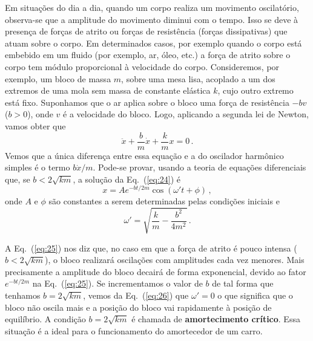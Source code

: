 \documentclass[12pt,a4paper]{article}
\theoremstyle{definition}
\begin{document}
Em situações do dia a dia, quando um corpo realiza um movimento
oscilatório, observa-se que a amplitude do movimento diminui com o
tempo. Isso se deve à presença de forças de atrito ou forças de
resistência (forças dissipativas) que atuam sobre o corpo. Em
determinados casos, por exemplo quando o corpo está embebido em um
fluido (por exemplo, ar, óleo, etc.) a força de atrito sobre o corpo
tem módulo proporcional à velocidade do corpo. Consideremos, por
exemplo, um bloco de massa $m$, sobre uma mesa lisa, acoplado a um dos
extremos de uma mola sem massa de constante elástica $k$, cujo outro
extremo está fixo. Suponhamos que o ar aplica sobre o bloco uma força
de resistência $-bv$ ($b>0$), onde $v$ é a velocidade do bloco. Logo,
aplicando a segunda lei de Newton, vamos obter que
\begin{equation}
  \label{eq:24}
  \ddot x+\frac{b}{m}\dot x+\frac{k}{m}x=0\,.
\end{equation}
Vemos que a única diferença entre essa equação e a do oscilador
harmônico simples é o termo $b\dot x/m$. Pode-se provar, usando a
teoria de equações diferenciais que, se $b<2\sqrt{km}$, a solução da
Eq.~(\ref{eq:24}) é
\begin{equation}
  \label{eq:25}
  x=Ae^{-bt/2m}\cos(\omega' t+\phi)\,,
\end{equation}
onde $A$ e $\phi$ são constantes a serem determinadas pelas condições
iniciais e
\begin{equation}
  \label{eq:26}
  \omega'=\sqrt{\frac{k}{m}-\frac{b^2}{4m^2}}\,.
\end{equation}

A Eq.~(\ref{eq:25}) nos diz que, no caso em que a força de atrito é
pouco intensa ($b<2\sqrt{km}$), o bloco realizará oscilações com
amplitudes cada vez menores. Mais precisamente a amplitude do bloco
decairá de forma exponencial, devido ao fator $e^{-bt/2m}$ na
Eq.~(\ref{eq:25}).  Se incrementamos o valor de $b$ de tal forma que
tenhamos $b=2\sqrt{km}$, vemos da Eq.~(\ref{eq:26}) que $\omega'=0$ o
que significa que o bloco não oscila mais e a posição do bloco vai
rapidamente à posição de equilíbrio. A condição $b=2\sqrt{km}$ é
chamada de \textbf{amortecimento crítico}. Essa situação é a ideal
para o funcionamento do amortecedor de um carro.
\end{document}
